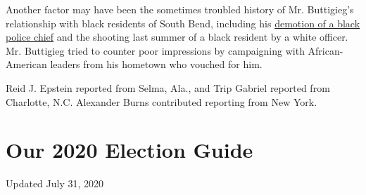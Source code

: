 Another factor may have been the sometimes troubled history of Mr.
Buttigieg's relationship with black residents of South Bend, including
his
\href{https://www.nytimes.com/2019/04/19/us/politics/buttigieg-black-police-chief-fired.html}{demotion
of a black police chief} and the shooting last summer of a black
resident by a white officer. Mr. Buttigieg tried to counter poor
impressions by campaigning with African-American leaders from his
hometown who vouched for him.

Reid J. Epstein reported from Selma, Ala., and Trip Gabriel reported
from Charlotte, N.C. Alexander Burns contributed reporting from New
York.

\hypertarget{our-2020-election-guide}{%
\section{Our 2020 Election Guide}\label{our-2020-election-guide}}

Updated July 31, 2020

